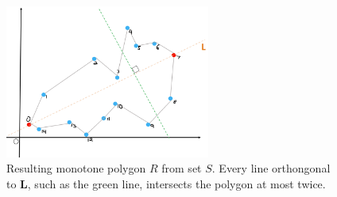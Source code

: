 \documentclass [12pt]{article}
\begin{document}
        \begin{figure}[h] 
            \centering
            \includegraphics[width=0.6\textwidth]{images/monotonehull3.PNG}
            \caption{Resulting monotone polygon $R$ from set $S$. Every line orthongonal to \textbf{L}, such as the green line, intersects the polygon at most twice.}
            \label{fig:mono3}
        \end{figure}


        \pagebreak
\end{document}

